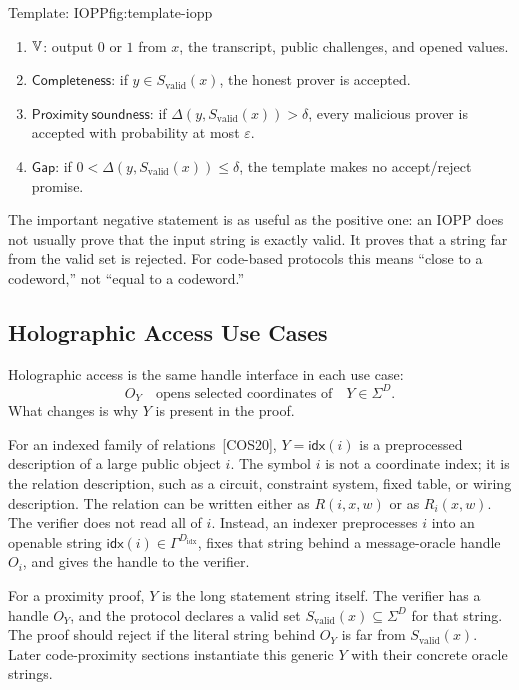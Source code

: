 \begin{protocolbox}{Template: IOPP}{fig:template-iopp}
\begin{enumerate}[leftmargin=0.24in,label=\textbf{P\arabic*.},itemsep=0.08em,topsep=0.1em,parsep=0pt]
  \item \(\mathbb{V}\): output \(0\) or \(1\) from \(x\), the transcript,
        public challenges, and opened values.
  \item \(\mathsf{Completeness}\): if \(y\in S_{\mathrm{valid}}(x)\), the
        honest prover is accepted.
  \item \(\mathsf{Proximity\ soundness}\): if
        \(\Delta(y,S_{\mathrm{valid}}(x))>\delta\), every malicious prover is
        accepted with probability at most \(\varepsilon\).
  \item \(\mathsf{Gap}\): if \(0<\Delta(y,S_{\mathrm{valid}}(x))\le\delta\),
        the template makes no accept/reject promise.
\end{enumerate}
\end{protocolbox}

The important negative statement is as useful as the positive one: an IOPP does
not usually prove that the input string is exactly valid.  It proves that a
string far from the valid set is rejected.  For code-based protocols this means
``close to a codeword,'' not ``equal to a codeword.''

\subsection{Holographic Access Use Cases}

Holographic access is the same handle interface in each use case:
\[
  O_Y\quad\text{opens selected coordinates of}\quad Y\in\Sigma^D.
\]
What changes is why \(Y\) is present in the proof.

For an indexed family of relations~[COS20], \(Y=\mathsf{idx}(i)\) is a
preprocessed description of a large public object \(i\).  The symbol \(i\) is
not a coordinate index; it is the relation description, such as a circuit,
constraint system, fixed table, or wiring description.  The relation can be
written either as \(R(i,x,w)\) or as \(R_i(x,w)\).  The verifier does not read
all of \(i\).  Instead, an indexer preprocesses \(i\) into an openable string
\(\mathsf{idx}(i)\in\Gamma^{D_{\mathrm{idx}}}\), fixes that string behind a
message-oracle handle \(O_i\), and gives the handle to the verifier.

For a proximity proof, \(Y\) is the long statement string itself.  The verifier
has a handle \(O_Y\), and the protocol declares a valid set
\(S_{\mathrm{valid}}(x)\subseteq\Sigma^D\) for that string.  The proof should
reject if the literal string behind \(O_Y\) is far from
\(S_{\mathrm{valid}}(x)\).  Later code-proximity sections instantiate this
generic \(Y\) with their concrete oracle strings.

